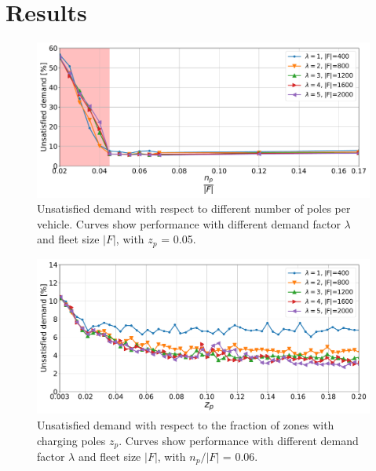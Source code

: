 \section{Results}
\label{sec:10_5_results}





\begin{figure}[t]
\centering
\includegraphics[width=1.\linewidth]{fig/final/unsatisfied_zp-5.pdf}
\caption{Unsatisfied demand with respect to different number of poles per vehicle. Curves show performance with different demand factor $\lambda$ and fleet size $|F|$, with $z_p$ = 0.05.}
\label{fig:10_5_unsatisfied_load1_zp5}
\end{figure}


\begin{figure}[t]
\centering
\includegraphics[width=1.\linewidth]{fig/final/unsatisfied_zp.pdf}
\caption{Unsatisfied demand with respect to the fraction of zones with charging poles  $z_p$. Curves show performance with different demand factor $\lambda$ and fleet size $|F|$, with  $n_p/|F|$ = 0.06.}
\label{fig:10_5_unsatisfied_zp}
\end{figure}


